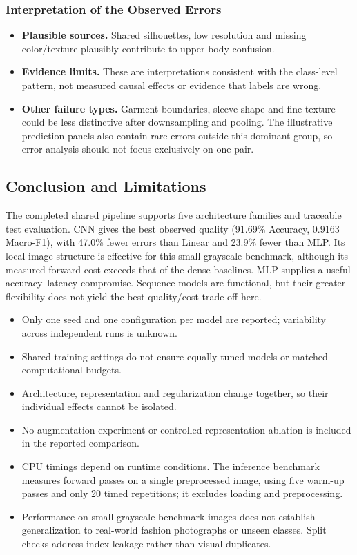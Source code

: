 \subsubsection{Interpretation of the Observed Errors}
\begin{itemize}
\setlength{\itemsep}{3pt}
\setlength{\parskip}{0pt}
\item \textbf{Plausible sources.} Shared silhouettes, low resolution and missing color/texture plausibly contribute to upper-body confusion.
\item \textbf{Evidence limits.} These are interpretations consistent with the class-level pattern, not measured causal effects or evidence that labels are wrong.
\item \textbf{Other failure types.} Garment boundaries, sleeve shape and fine texture could be less distinctive after downsampling and pooling. The illustrative prediction panels also contain rare errors outside this dominant group, so error analysis should not focus exclusively on one pair.
\end{itemize}

\subsection{Conclusion and Limitations}
The completed shared pipeline supports five architecture families and traceable test evaluation. CNN gives the best observed quality (91.69\% Accuracy, 0.9163 Macro-F1), with 47.0\% fewer errors than Linear and 23.9\% fewer than MLP. Its local image structure is effective for this small grayscale benchmark, although its measured forward cost exceeds that of the dense baselines. MLP supplies a useful accuracy--latency compromise. Sequence models are functional, but their greater flexibility does not yield the best quality/cost trade-off here.

\begin{itemize}
\setlength{\itemsep}{3pt}\setlength{\parskip}{0pt}
\item Only one seed and one configuration per model are reported; variability across independent runs is unknown.
\item Shared training settings do not ensure equally tuned models or matched computational budgets.
\item Architecture, representation and regularization change together, so their individual effects cannot be isolated.
\item No augmentation experiment or controlled representation ablation is included in the reported comparison.
\item CPU timings depend on runtime conditions. The inference benchmark measures forward passes on a single preprocessed image, using five warm-up passes and only 20 timed repetitions; it excludes loading and preprocessing.
\item Performance on small grayscale benchmark images does not establish generalization to real-world fashion photographs or unseen classes. Split checks address index leakage rather than visual duplicates.
\end{itemize}
